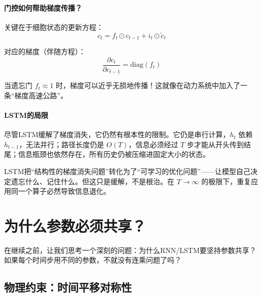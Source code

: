 \paragraph{门控如何帮助梯度传播？}

关键在于细胞状态的更新方程：
\begin{equation}
    c_t = f_t \odot c_{t-1} + i_t \odot \tilde{c}_t
\end{equation}

对应的梯度（伴随方程）：
\begin{equation}
    \frac{\partial c_t}{\partial c_{t-1}} = \text{diag}(f_t)
\end{equation}

当遗忘门 $f_t \approx 1$ 时，梯度可以近乎无损地传播！这就像在动力系统中加入了一条“梯度高速公路”。

\paragraph{LSTM的局限}

尽管LSTM缓解了梯度消失，它仍然有根本性的限制。它仍是串行计算，$h_t$ 依赖 $h_{t-1}$，无法并行；路径长度仍是 $O(T)$，信息必须经过 $T$ 步才能从开头传到结尾；信息瓶颈也依然存在，所有历史仍被压缩进固定大小的状态。

\begin{remark}
LSTM把“结构性的梯度消失问题”转化为了“可学习的优化问题”——让模型自己决定遗忘什么、记住什么。但这只是缓解，不是根治。在 $T \to \infty$ 的极限下，重复应用同一个算子必然导致信息退化。
\end{remark}

\section{为什么参数必须共享？}

在继续之前，让我们思考一个深刻的问题：为什么RNN/LSTM要坚持参数共享？如果每个时间步用不同的参数，不就没有连乘问题了吗？


\subsection{物理约束：时间平移对称性}

